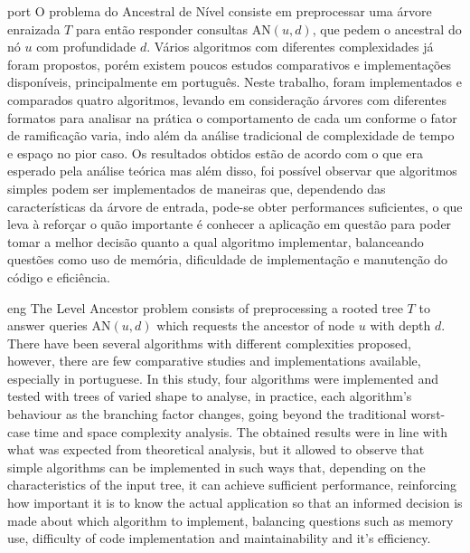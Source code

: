 
\begin{resumo}{port}
O problema do Ancestral de Nível consiste em preprocessar uma árvore enraizada
$T$ para então responder consultas AN$(u,d)$, que pedem o ancestral do nó $u$ com
profundidade $d$. Vários algoritmos com diferentes complexidades já foram propostos,
porém existem poucos estudos comparativos e implementações disponíveis, principalmente
em português. Neste trabalho, foram implementados e comparados quatro algoritmos,
levando em consideração árvores com diferentes formatos para analisar na prática o
comportamento de cada um conforme o fator de ramificação varia, indo além
da análise tradicional de complexidade de tempo e espaço no pior caso. Os resultados
obtidos estão de acordo com o que era esperado pela análise teórica mas além disso,
foi possível observar que algoritmos simples podem ser implementados de maneiras que,
dependendo das características da árvore de entrada, pode-se obter performances
suficientes, o que leva à reforçar o quão importante é conhecer a aplicação em
questão para poder tomar a melhor decisão quanto a qual algoritmo implementar,
balanceando questões como uso de memória, dificuldade de implementação e manutenção
do código e eficiência.

\end{resumo}

\begin{resumo}{eng}
The Level Ancestor problem consists of preprocessing a rooted tree $T$ to answer
queries AN$(u,d)$ which requests the ancestor of node $u$ with depth $d$. There
have been several algorithms with different complexities proposed, however, there are
few comparative studies and implementations available, especially in portuguese. In
this study, four algorithms were implemented and tested with trees of varied shape
to analyse, in practice, each algorithm's behaviour as the branching factor changes,
going beyond the traditional worst-case time and space complexity analysis. The
obtained results were in line with what was expected from theoretical analysis, but
it allowed to observe that simple algorithms can be implemented in such ways that,
depending on the characteristics of the input tree, it can achieve sufficient
performance, reinforcing how important it is to know the actual application so that
an informed decision is made about which algorithm to implement, balancing questions
such as memory use, difficulty of code implementation and maintainability and it's
efficiency.
\end{resumo}
